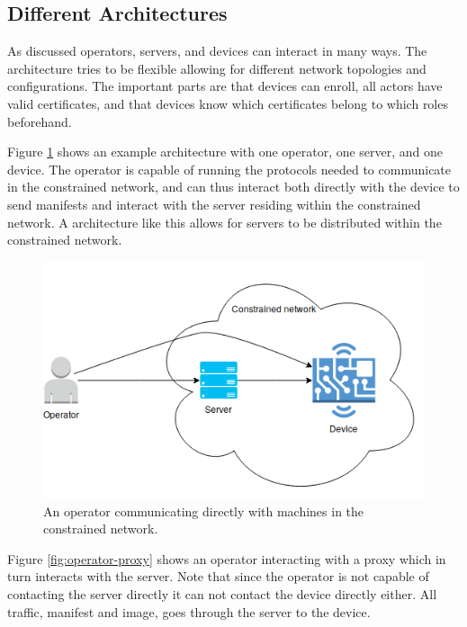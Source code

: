 \documentclass[0-thesis.tex]{subfiles}
\begin{document}
\subsection{Different Architectures}
\label{ssec:different-architectures}
As discussed operators, servers, and devices can interact in many ways. The architecture
tries to be flexible allowing for different network topologies and configurations. The
important parts are that devices can enroll, all actors have valid certificates, and that
devices know which certificates belong to which roles beforehand. 

Figure \ref{fig:operator-direct} shows an example architecture with one operator, one
server, and one device. The operator is capable of running the protocols needed to
communicate in the constrained network, and can thus interact both directly with the
device to send manifests and interact with the server residing within the constrained
network. A architecture like this allows for servers to be distributed within the
constrained network.

\begin{figure}
    \caption{An operator communicating directly with machines in the constrained network.}
    \label{fig:operator-direct}
    \includegraphics[scale=0.8]{images/operator-direct.png}
\end{figure}

Figure \ref{fig:operator-proxy} shows an operator interacting with a proxy which in turn
interacts with the server. Note that since the operator is not capable of contacting the
server directly it can not contact the device directly either. All traffic, manifest and
image, goes through the server to the device. 
\end{document}
